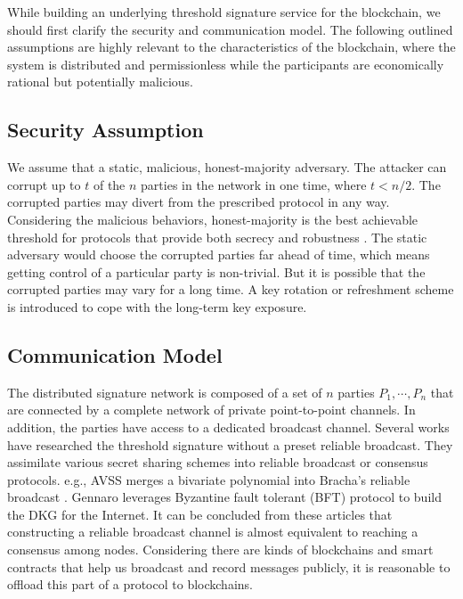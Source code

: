 \documentclass[11pt]{article}
\begin{document}
While building an underlying threshold signature service for the blockchain, we should first clarify the security and communication model. The following outlined assumptions are highly relevant to the characteristics of the blockchain, where the system is distributed and permissionless while the participants are economically rational but potentially malicious.

\subsection{Security Assumption}

We assume that a static, malicious, honest-majority adversary. The attacker can corrupt up to $t$ of the $n$ parties in the network in one time, where $t < n/2$. The corrupted parties may divert from the prescribed protocol in any way. Considering the malicious behaviors, honest-majority is the best achievable threshold for protocols that provide both secrecy and robustness \cite{gennaro2007secure}. The static adversary would choose the corrupted parties far ahead of time, which means getting control of a particular party is non-trivial. But it is possible that the corrupted parties may vary for a long time. A key rotation or refreshment scheme is introduced to cope with the long-term key exposure.

\subsection{Communication Model}

The distributed signature network is composed of a set of $n$ parties $P_1, \cdots, P_n$ that are connected by a complete network of private point-to-point channels. In addition, the parties have access to a dedicated broadcast channel. Several works\cite{kate2009distributed,kate2012distributed,cachin2002asynchronous} have researched the threshold signature without a preset reliable broadcast. They assimilate various secret sharing schemes into reliable broadcast or consensus protocols. e.g., AVSS\cite{cachin2002asynchronous} merges a bivariate polynomial into Bracha’s reliable broadcast \cite{bracha1984asynchronous}. Gennaro\cite{gennaro2007secure} leverages Byzantine fault tolerant (BFT) protocol\cite{castro1999practical} to build the DKG for the Internet. It can be concluded from these articles that constructing a reliable broadcast channel is almost equivalent to reaching a consensus among nodes. Considering there are kinds of blockchains and smart contracts that help us broadcast and record messages publicly, it is reasonable to offload this part of a protocol to blockchains.
\end{document}
